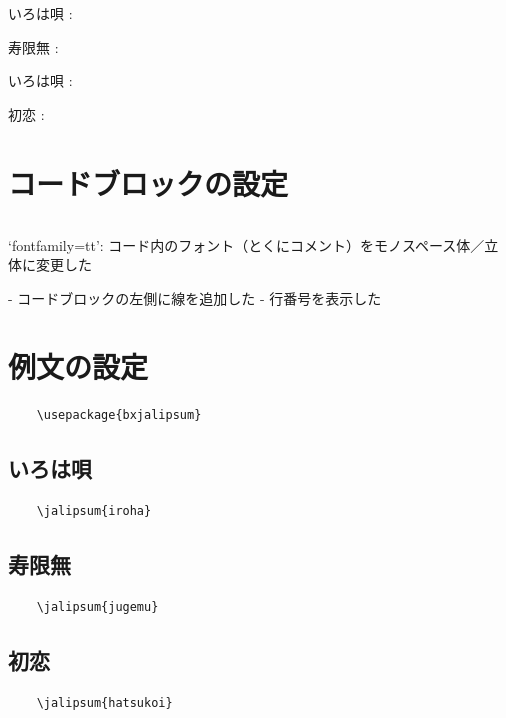 \documentclass[
    article,
    head_space=25truemm,
    foot_space=10truemm,
    gutter=15truemm]{jlreq}
\begin{document}
\begin{markdown}
いろは唄
: 

寿限無
: 

いろは唄
: 

初恋
: 
\end{markdown}

\section{コードブロックの設定}

\inputminted{latex}{preamble/minted.tex}

\begin{markdown}
`fontfamily=tt':
コード内のフォント（とくにコメント）をモノスペース体／立体に変更した

- コードブロックの左側に線を追加した
- 行番号を表示した
\end{markdown}

\section{例文の設定}

\begin{verbatim}
    \usepackage{bxjalipsum}
\end{verbatim}

\subsection{いろは唄}

\begin{verbatim}
    \jalipsum{iroha}
\end{verbatim}

\subsection{寿限無}

\begin{verbatim}
    \jalipsum{jugemu}
\end{verbatim}

\subsection{初恋}

\begin{verbatim}
    \jalipsum{hatsukoi}
\end{verbatim}
\end{document}
